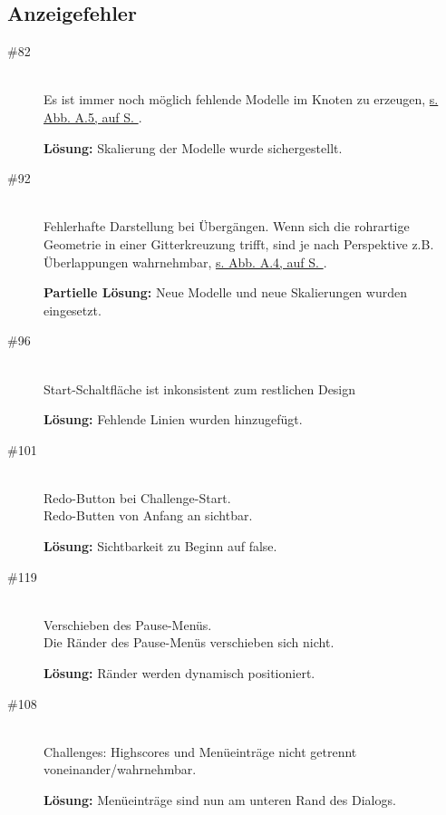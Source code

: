 %



\clearpage



\label{Anhang:Anzeigefehler}



\subsection*{Anzeigefehler}



\begin{description}


\item[\#82] \hfill \\
Es ist immer noch möglich \glqq fehlende Modelle im Knoten zu erzeugen\grqq, \hyperref[Anhang:Grafikfehler:Loechrige_Uebergaenge]{s. Abb. A.5, auf S. \pageref{Anhang:Grafikfehler:Loechrige_Uebergaenge}}.

{\bfseries Lösung:} Skalierung der Modelle wurde sichergestellt.


\item[\#92] \hfill \\
Fehlerhafte Darstellung bei Übergängen. Wenn sich die rohrartige Geometrie in einer Gitterkreuzung trifft, sind je nach Perspektive z.B. Überlappungen wahrnehmbar, \hyperref[Anhang:Grafikfehler:Verschmolzene_Geometrie]{s. Abb. A.4, auf S. \pageref{Anhang:Grafikfehler:Verschmolzene_Geometrie}}.

{\bfseries Partielle Lösung:} Neue Modelle und neue Skalierungen wurden eingesetzt.


\item[\#96] \hfill \\
\glqq Start\grqq-Schaltfläche ist inkonsistent zum restlichen Design

{\bfseries Lösung:} Fehlende Linien wurden hinzugefügt.


\item[\#101] \hfill \\
Redo-Button bei Challenge-Start.\\
Redo-Butten von Anfang an sichtbar.
 
{\bfseries Lösung:} Sichtbarkeit zu Beginn auf \glqq false\grqq.


\item[\#119] \hfill \\
Verschieben des Pause-Menüs. \\
Die Ränder des Pause-Menüs verschieben sich nicht.

{\bfseries Lösung:} Ränder werden dynamisch positioniert. 


\item[\#108] \hfill \\
Challenges: Highscores und Menüeinträge nicht getrennt voneinander/wahrnehmbar.
 
{\bfseries Lösung:} Menüeinträge sind nun am unteren Rand des Dialogs.
 
 
\end{description}



~\\


